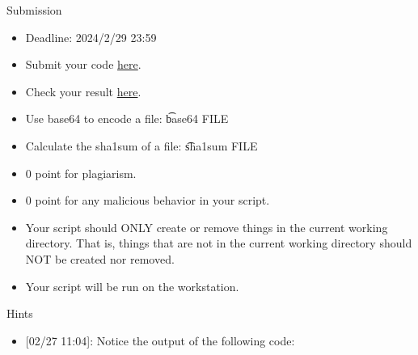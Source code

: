 \begin{frame}{Submission}
\begin{itemize}
\item Deadline: 2024/2/29 23:59
\item Submit your code \href{https://forms.gle/ruzJYMdvkmZ6u9CY9}{here}.
\item Check your result \href{https://docs.google.com/spreadsheets/d/1WM8s-83BM6E4rtIQqPEAteCGHQWJ7LZSKluali3owi0/edit?usp=sharing}{here}.
\item Use base64 to encode a file: \t{base64 FILE}
\item Calculate the sha1sum of a file: \t{sha1sum FILE}
\item $0$ point for plagiarism.
\item $0$ point for any malicious behavior in your script.
\item Your script should ONLY create or remove things in the current working directory. That is, things that are not in the current working directory should NOT be created nor removed.
\item Your script will be run on the workstation.
\end{itemize}
\end{frame}

\begin{frame}{Hints}
\begin{itemize}
\item {[}02/27 11:04{]}: Notice the output of the following code:

\end{itemize}
\end{frame}
